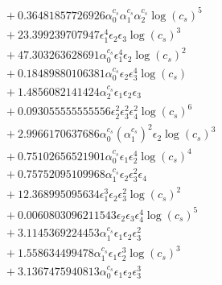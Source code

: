 \documentclass[10pt]{article}
\begin{document}
\begin{align*}
&{}  + 0.36481857726926 \alpha_{0}^{c_s} \alpha_{1}^{c_s} \alpha_{2}^{c_s} \log{\left(c_{s} \right)}^{5} \\
&{}  + 23.399239707947 \epsilon_{1}^{4} \epsilon_{2} \epsilon_{3} \log{\left(c_{s} \right)}^{3} \\
&{}  + 47.303263628691 \alpha_{0}^{c_s} \epsilon_{1}^{4} \epsilon_{2} \log{\left(c_{s} \right)}^{2} \\
&{}  + 0.18489880106381 \alpha_{0}^{c_s} \epsilon_{2} \epsilon_{3}^{4} \log{\left(c_{s} \right)} \\
&{}  + 1.4856082141424 \alpha_{2}^{c_s} \epsilon_{1} \epsilon_{2} \epsilon_{3} \\
&{}  + 0.093055555555556 \epsilon_{2}^{2} \epsilon_{3}^{2} \epsilon_{4}^{2} \log{\left(c_{s} \right)}^{6} \\
&{}  + 2.9966170637686 \alpha_{0}^{c_s} \left(\alpha_{1}^{c_s}\right)^{2} \epsilon_{2} \log{\left(c_{s} \right)}^{3} \\
&{}  + 0.75102656521901 \alpha_{0}^{c_s} \epsilon_{1} \epsilon_{2}^{4} \log{\left(c_{s} \right)}^{4} \\
&{}  + 0.75752095109968 \alpha_{1}^{c_s} \epsilon_{2} \epsilon_{3}^{2} \epsilon_{4} \\
&{}  + 12.368995095634 \epsilon_{1}^{3} \epsilon_{2} \epsilon_{3}^{2} \log{\left(c_{s} \right)}^{2} \\
&{}  + 0.0060803096211543 \epsilon_{2} \epsilon_{3} \epsilon_{4}^{4} \log{\left(c_{s} \right)}^{5} \\
&{}  + 3.1145369224453 \alpha_{1}^{c_s} \epsilon_{1} \epsilon_{2} \epsilon_{3}^{2} \\
&{}  + 1.558634499478 \alpha_{1}^{c_s} \epsilon_{1} \epsilon_{2}^{3} \log{\left(c_{s} \right)}^{3} \\
&{}  + 3.1367475940813 \alpha_{0}^{c_s} \epsilon_{1} \epsilon_{2} \epsilon_{3}^{3}
\end{align*}
\end{document}
